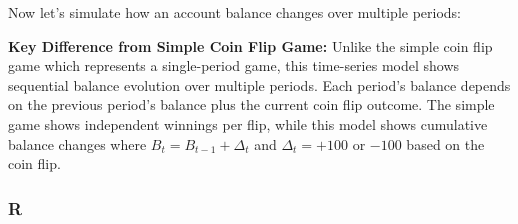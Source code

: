 \documentclass[
  letterpaper,
  DIV=11,
  numbers=noendperiod]{scrartcl}
\theoremstyle{definition}
\theoremstyle{remark}
\begin{document}
Now let's simulate how an account balance changes over multiple periods:

\textbf{Key Difference from Simple Coin Flip Game:} Unlike the simple
coin flip game which represents a single-period game, this time-series
model shows sequential balance evolution over multiple periods. Each
period's balance depends on the previous period's balance plus the
current coin flip outcome. The simple game shows independent winnings
per flip, while this model shows cumulative balance changes where
\(B_t = B_{t-1} + \Delta_t\) and \(\Delta_t = +100\) or \(-100\) based
on the coin flip.

\subsubsection{R}
\end{document}
